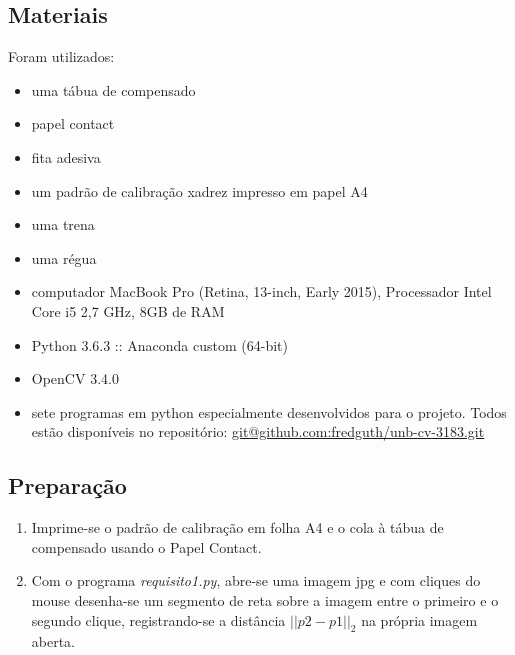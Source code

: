 \documentclass[conference]{IEEEtran}
\begin{document}
\subsection{Materiais}
Foram utilizados:
\begin{itemize}
\item uma tábua de compensado
\item papel contact
\item fita adesiva
\item um padrão de calibração xadrez impresso em papel A4
\item uma trena
\item uma régua
\item computador MacBook Pro (Retina, 13-inch, Early 2015), Processador Intel Core i5 2,7 GHz, 8GB de RAM
\item Python 3.6.3 :: Anaconda custom (64-bit)
\item OpenCV 3.4.0
\item sete programas em python especialmente desenvolvidos para o projeto. Todos estão disponíveis no repositório: \url{git@github.com:fredguth/unb-cv-3183.git}\label{repo}
\end{itemize}

\subsection{Preparação}
 \begin{enumerate}
 \item Imprime-se o padrão de calibração em folha A4 e o cola à tábua de compensado usando o Papel Contact.
 \item Com o programa \textit{requisito1.py}, abre-se uma imagem jpg e com cliques do mouse desenha-se um segmento de reta sobre a imagem entre o primeiro e o segundo clique, registrando-se a distância \(||p2 - p1||_2 \) na própria imagem aberta. 
 \end{enumerate}
\end{document}

